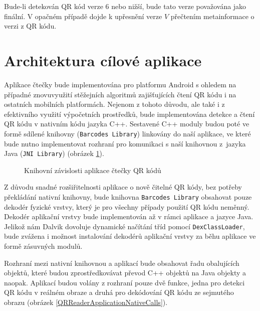 Bude-li detekován QR kód verze 6 nebo nižší, bude tato verze považována jako
finální. V opačném případě dojde k upřesnění verze $V$ přečtením metainformace 
o verzi z QR kódu. 

\section{Architektura cílové aplikace}
\label{architekturaCiloveAplikace}

Aplikace čtečky bude implementována pro platformu Android s ohledem na případné
znovuvyužití stěžejních algoritmů zajišťujících čtení QR kódu i na ostatních
mobilních platformách. Nejenom z tohoto důvodu, ale také i z efektivního využití
výpočetních prostředků, bude implementována detekce a čtení QR kódu v nativním
kódu jazyka C++. Sestavené C++ moduly budou poté ve formě sdílené knihovny
(\texttt{Barcodes Library}) linkovány do naší aplikace, ve které bude nutno
implementovat rozhraní pro komunikaci s naší knihovnou z~jazyka Java
(\texttt{JNI Library}) (obrázek \ref{QRReaderApplicationLibraryDependency}).

\begin{figure}[H]
  \begin{center}
    \caption{Knihovní závislosti aplikace čtečky QR kódů}
    \label{QRReaderApplicationLibraryDependency}
  \end{center}
\end{figure}

Z důvodu snadné rozšiřitelnosti aplikace o nově čitelné QR kódy, bez potřeby
překládání nativní knihovny, bude knihovna \texttt{Barcodes Library} obsahovat
pouze dekodér fyzické vrstvy, který je pro všechny případy použití QR kódu
neměnný. Dekodér aplikační vrstvy bude implementován až v rámci aplikace a jazyce Java. Jelikož nám Dalvik
dovoluje dynamické načítání tříd pomocí \texttt{DexClassLoader}, bude zvážena i
možnost instalování dekodérů aplikační vrstvy za běhu aplikace ve formě zásuvných modulů.

Rozhraní mezi nativní knihovnou a aplikací bude obsahovat řadu obalujících
objektů, které budou zprostředkovávat převod C++ objektů na Java objekty a 
naopak. Aplikací budou volány z rozhraní pouze dvě funkce, jedna pro detekci
QR kódu v reálném obraze a druhá pro dekódování QR kódu ze sejmutého obrazu
(obrázek \ref{QRReaderApplicationNativeCalls}).

